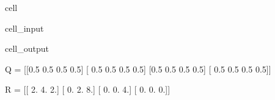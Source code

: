 \documentclass[letterpaper,10pt,english]{jupyterBook}
\begin{document}
\begin{sphinxuseclass}{cell}\begin{sphinxVerbatimInput}

\begin{sphinxuseclass}{cell_input}
\begin{sphinxVerbatim}[commandchars=\\\{\}]
  \PYG{p}{[}\PYG{p}{[}  \PYG{p}{]} \PYG{p}{[}  \PYG{p}{]} \PYG{p}{[}  \PYG{p}{]} \PYG{p}{[}  \PYG{p}{]}\PYG{p}{]}

   

\PYG{p}{[}  \PYG{p}{]}               
\end{sphinxVerbatim}

\end{sphinxuseclass}\end{sphinxVerbatimInput}
\begin{sphinxVerbatimOutput}

\begin{sphinxuseclass}{cell_output}
\begin{sphinxVerbatim}[commandchars=\\\{\}]
Q = 
[[\PYGZhy{}0.5 \PYGZhy{}0.5  0.5  0.5]
 [ 0.5 \PYGZhy{}0.5  0.5 \PYGZhy{}0.5]
 [\PYGZhy{}0.5 \PYGZhy{}0.5 \PYGZhy{}0.5 \PYGZhy{}0.5]
 [ 0.5 \PYGZhy{}0.5 \PYGZhy{}0.5  0.5]]

R = 
[[ 2.  4.  2.]
 [ 0. \PYGZhy{}2. \PYGZhy{}8.]
 [ 0.  0. \PYGZhy{}4.]
 [ 0.  0.  0.]]
\end{sphinxVerbatim}

\end{sphinxuseclass}\end{sphinxVerbatimOutput}

\end{sphinxuseclass}
\end{document}
